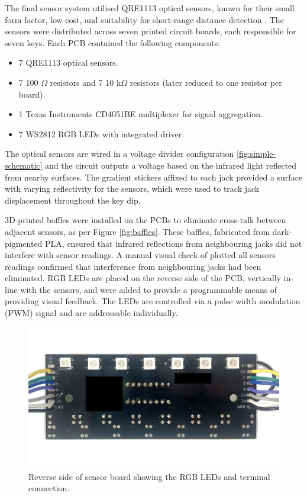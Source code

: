 The final sensor system utilised QRE1113 optical sensors, known for their small form factor, low cost, and suitability for short-range distance detection \cite{McPherson2013, McPherson2019}. The sensors were distributed across seven printed circuit boards, each responsible for seven keys. Each PCB contained the following components:

\begin{itemize}
    \item 7 QRE1113 optical sensors.
    \item 7 100 $\Omega$ resistors and 7 10 k$\Omega$ resistors (later reduced to one resistor per board).
    \item 1 Texas Instruments CD4051BE multiplexer for signal aggregation.
    \item 7 WS2812 RGB LEDs with integrated driver.
\end{itemize}

The optical sensors are wired in a voltage divider configuration \ref{fig:simple-schematic} and the circuit outputs a voltage based on the infrared light reflected from nearby surfaces. 
The gradient stickers affixed to each jack provided a surface with varying reflectivity for the sensors, which were used to track jack displacement throughout the key dip. 

3D-printed baffles were installed on the PCBs to eliminate cross-talk between adjacent sensors, as per Figure \ref{fig:baffles}. These baffles, fabricated from dark-pigmented PLA, ensured that infrared reflections from neighbouring jacks did not interfere with sensor readings. A manual visual check of plotted all sensors readings confirmed that interference from neighbouring jacks had been eliminated. RGB LEDs are placed on the reverse side of the PCB, vertically in-line with the sensors, and were added to provide a programmable means of providing visual feedback. The LEDs are controlled via a pulse width modulation (PWM) signal and are addressable individually.

\begin{figure}[!b] 
  \centering
  \includegraphics[width=\linewidth,trim={0 10cm 0 7cm},clip]{src/images/sensor-board-reverse-side-anon.png} 
  \caption{Reverse side of sensor board showing the RGB LEDs and terminal connection.}
  \Description{} 
  \label{fig:sensor-reverse}
\end{figure}

